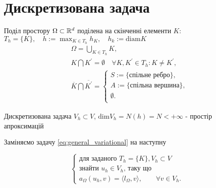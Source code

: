 
\section{Дискретизована задача}
\frame{\sectionpage}
\begin{frame}{Поділ простору}
		 $\Omega \subset \mathbb{R}^d$ поділена на скінченні елементи $K$:
		 $
			T_h=\lbrace K \rbrace, \quad
			h := \max_{K \in T_h}h_K, \quad
			h_k := \mbox{diam} K
		$
		\begin{equation}\label{eq:split_properties}
			\begin{split}
				& \Omega = \bigcup_{K \in T_h} K, \\
				& K \bigcap K^\prime = \emptyset \quad \forall K, K^\prime \in T_h : K \neq K^\prime, \\
				& \overline K \bigcap \overline {K^\prime} =
				\begin{cases}
					S := \mbox{\{спільне ребро\}}, \\
					A := \mbox{\{спільна вершина\}},  \\
					\emptyset. \\
				\end{cases}
			\end{split}
		\end{equation}
\end{frame}

\begin{frame}{Дискретизована задача}
		$V_h \subset V$, $\mbox{dim} V_h = N(h) = N < + \infty$ - простір апроксимацій

		Заміняємо задачу \eqref{eq:general_variational} на наступну

		\begin{equation}\label{eq:general_discrete}
			\begin{cases}
				\mbox{для заданого } T_h = \{K\}, V_h  \subset V \\
				\mbox{знайти } u_h \in V_h \mbox{, таку що} \\
				a_\Omega(u_h, v) = \langle l_\Omega, v \rangle, \qquad \forall v \in V_h.
			\end{cases}
		\end{equation}

\end{frame}


